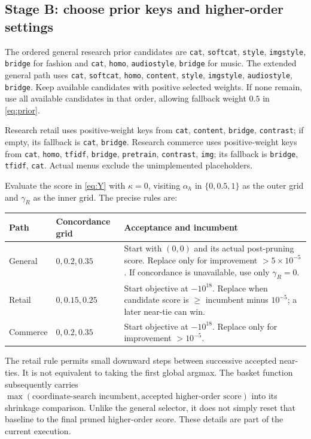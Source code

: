 \documentclass[11pt,a4paper]{article}
\newcommand{\code}[1]{\nolinkurl{#1}}
\numberwithin{equation}{section}
\begin{document}
\subsection{Stage B: choose prior keys and higher-order settings}
The ordered general research prior candidates are
\code{cat}, \code{softcat}, \code{style}, \code{imgstyle}, \code{bridge} for fashion and
\code{cat}, \code{homo}, \code{audiostyle}, \code{bridge} for music. The extended general path uses
\code{cat}, \code{softcat}, \code{homo}, \code{content}, \code{style}, \code{imgstyle}, \code{audiostyle}, \code{bridge}.
Keep available candidates with positive selected weights. If none remain, use all available
candidates in that order, allowing fallback weight $0.5$ in \eqref{eq:prior}.

Research retail uses positive-weight keys from \code{cat}, \code{content}, \code{bridge}, \code{contrast}; if
empty, its fallback is \code{cat}, \code{bridge}. Research commerce uses positive-weight keys
from \code{cat}, \code{homo}, \code{tfidf}, \code{bridge}, \code{pretrain}, \code{contrast}, \code{img}; its fallback is
\code{bridge}, \code{tfidf}, \code{cat}. Actual menus exclude the unimplemented placeholders.

Evaluate the score in \eqref{eq:Y} with $\kappa=0$, visiting $\alpha_h$ in
$\{0,0.5,1\}$ as the outer grid and $\gamma_R$ as the inner grid. The precise rules are:
\begin{center}\small
\begin{tabularx}{\linewidth}{@{}p{.19\linewidth}p{.18\linewidth}Y@{}}
\toprule Path & Concordance grid & Acceptance and incumbent \\\midrule
General & $0,0.2,0.35$ & Start with $(0,0)$ and its actual post-pruning score. Replace only for improvement $>5\times10^{-5}$. If concordance is unavailable, use only $\gamma_R=0$. \\
Retail & $0,0.15,0.25$ & Start objective at $-10^{18}$. Replace when candidate score is $\ge$ incumbent minus $10^{-5}$; a later near-tie can win. \\
Commerce & $0,0.2,0.35$ & Start objective at $-10^{18}$. Replace only for improvement $>10^{-5}$. \\
\bottomrule
\end{tabularx}
\end{center}
The retail rule permits small downward steps between successive accepted near-ties. It is
not equivalent to taking the first global argmax. The basket function subsequently carries
$\max(\text{coordinate-search incumbent},\text{accepted higher-order score})$ into its
shrinkage comparison. Unlike the general selector, it does not simply reset that baseline
to the final pruned higher-order score. These details are part of the current execution.
\end{document}
